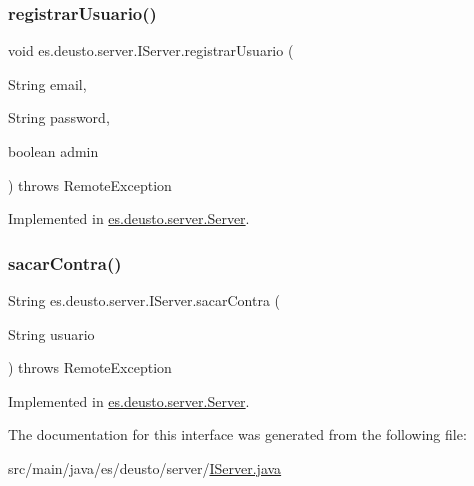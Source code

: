 \mbox{\label{interfacees_1_1deusto_1_1server_1_1_i_server_af6743c655c7831fa6d87e6e910bb6db4}} 
\subsubsection{\texorpdfstring{registrarUsuario()}{registrarUsuario()}}
{\footnotesize\ttfamily void es.\+deusto.\+server.\+I\+Server.\+registrar\+Usuario (\begin{DoxyParamCaption}\item[{String}]{email,  }\item[{String}]{password,  }\item[{boolean}]{admin }\end{DoxyParamCaption}) throws Remote\+Exception}



Implemented in \mbox{\hyperlink{classes_1_1deusto_1_1server_1_1_server_a0f79b8db6904facdae94410e26bef452}{es.\+deusto.\+server.\+Server}}.

\mbox{\label{interfacees_1_1deusto_1_1server_1_1_i_server_a950b819a4f67edf0ef76221dd4714d47}} 
\subsubsection{\texorpdfstring{sacarContra()}{sacarContra()}}
{\footnotesize\ttfamily String es.\+deusto.\+server.\+I\+Server.\+sacar\+Contra (\begin{DoxyParamCaption}\item[{String}]{usuario }\end{DoxyParamCaption}) throws Remote\+Exception}



Implemented in \mbox{\hyperlink{classes_1_1deusto_1_1server_1_1_server_aefe051d880626950ea2964d89a4ae3c3}{es.\+deusto.\+server.\+Server}}.



The documentation for this interface was generated from the following file\+:\begin{DoxyCompactItemize}
\item 
src/main/java/es/deusto/server/\mbox{\hyperlink{_i_server_8java}{I\+Server.\+java}}\end{DoxyCompactItemize}
